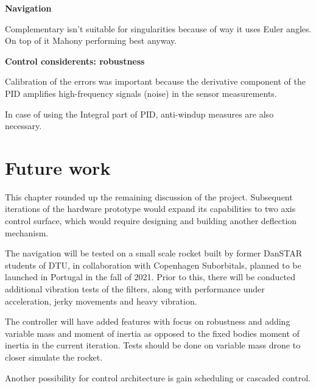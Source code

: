 \textbf{Navigation}

Complementary isn't suitable for singularities because of way it uses Euler angles. On top of it Mahony performing best anyway. 






\textbf{Control considerents: robustness}

Calibration of the errors was important because the derivative component of the PID amplifies high-frequency signals (noise) in the sensor measurements.

In case of using the Integral part of PID, anti-windup measures are also necessary. 


\section{Future work}

This chapter rounded up the remaining discussion of the project.
Subsequent iterations of the hardware prototype would expand its capabilities to two axis control surface, which would require designing and building another deflection mechanism.

The navigation will be tested on a small scale rocket built by former DanSTAR students of DTU, in collaboration with Copenhagen Suborbitals, planned to be launched in Portugal in the fall of 2021. Prior to this, there will be conducted additional vibration tests of the filters, along with performance under acceleration, jerky movements and heavy vibration. 

The controller will have added features with focus on robustness and adding variable mass and moment of inertia as opposed to the fixed bodies moment of inertia in the current iteration. Tests should be done on variable mass drone to closer simulate the rocket. 

Another possibility for control architecture is gain scheduling or cascaded control. 

